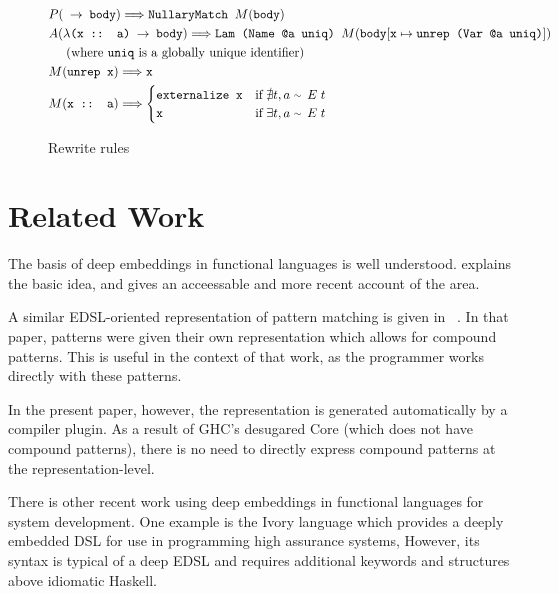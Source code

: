 \documentclass[sigplan,anonymous,review]{acmart}
\newcommand{\expr}[1]{(#1)} %
\newcommand{\rarr}{\rightarrow}
\newcommand{\rewrites}{\Longrightarrow}
\newcommand{\typeeq}{\raise.17ex\hbox{$\scriptstyle\mathtt{\sim}$}\,\;}
\newcommand{\ttt}{\texttt}
\newcommand{\showtodos}{}  %
\newenvironment{todo}
  {\ifthenelse{\isundefined{\showtodos}}{\comment}{\begin{tcolorbox}
    \textbf{TODO}:}}
  {\ifthenelse{\isundefined{\showtodos}}{\endcomment}{\end{tcolorbox}}
  }
\begin{document}
\begin{figure}[hp]
\begin{align*}
  &P\expr{\ttt{ $\rarr$ body}} \rewrites \ttt{NullaryMatch $M\expr{\ttt{body}}$}\\
  &A\expr{\ttt{$\lambda$(x :: a) $\rarr$ body}} \rewrites \ttt{Lam (Name @a uniq) $M\expr{\ttt{body$[\ttt{x} \mapsto \ttt{unrep (Var @a uniq)}]$}}$}\\
  &\text{\;\;\;\;\;(where \ttt{uniq} is a globally unique identifier)}\\
  &M\expr{\ttt{unrep x}} \rewrites \ttt{x}\\
  &M\expr{\ttt{x :: a}} \rewrites
    \begin{cases}
      \ttt{externalize x} & \text{if}\; \nexists t, a\; \typeeq E\; t\\
      \ttt{x} & \text{if}\; \exists t, a\; \typeeq E\; t
    \end{cases}
\end{align*}

\captionsetup{justification=centering}
\caption{Rewrite rules}
\label{fig:Rewrites}
\end{figure}


\clearpage
\section{Related Work}


The basis of deep embeddings in functional languages is well understood.
\cite{Elliott:03:CompileDSEL-JFP} explains the basic idea, and \cite{Gill:2014:DSLSynth}
gives an acceessable and more recent account of the area.

A similar EDSL-oriented representation of pattern matching is given in
~\cite[Section~3.3]{Atkey:09:Unembedding}. In that paper, patterns were given their own
representation which allows for compound patterns. This is useful in the context
of that work, as the programmer works directly with these patterns.

In the present paper, however, the representation is generated automatically by
a compiler plugin. As a result of GHC's desugared Core (which does not have
compound patterns), there is no need to directly express compound patterns at
the representation-level.

There is other recent work using deep embeddings in functional languages for 
system development.  One example is the Ivory language \cite{Elliott2015-Ivory} 
which provides a deeply embedded DSL for use in programming high assurance
systems,  However, its syntax is typical of a deep EDSL and requires additional
keywords and structures above idiomatic Haskell. 
\end{document}
